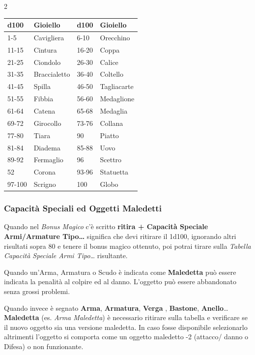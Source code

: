 \begin{multicols}{2}
{\begin{tabularx}{\linewidth}{X|l|X|l}
		\toprule
\rowcolor{gray!20}\textbf{d100} & \textbf{Gioiello} & \textbf{d100} & \textbf{Gioiello}\\
\toprule
1-5 & Cavigliera & 6-10 & Orecchino \\
\rowcolor{gray!20}11-15 & Cintura& 16-20 & Coppa\\
21-25 & Ciondolo& 26-30 & Calice\\
\rowcolor{gray!20}31-35 & Braccialetto& 36-40 & Coltello\\
41-45 & Spilla& 46-50 & Tagliacarte\\
\rowcolor{gray!20}51-55 & Fibbia& 56-60 & Medaglione\\
61-64 & Catena& 65-68 & Medaglia\\
\rowcolor{gray!20}69-72 & Girocollo& 73-76 & Collana\\
77-80 & Tiara& 90& Piatto\\
\rowcolor{gray!20}81-84 & Diadema& 85-88 & Uovo\\
89-92 & Fermaglio& 96 & Scettro\\
\rowcolor{gray!20}52    & Corona& 93-96 & Statuetta\\
97-100 & Scrigno& 100 & Globo
\end{tabularx}

\subsubsection{Capacità Speciali ed Oggetti Maledetti}

Quando nel \emph{Bonus Magico} c'è scritto \textbf{ritira + Capacità Speciale Armi/Armature Tipo…} significa che devi ritirare il 1d100, ignorando altri risultati sopra 80 e tenere il bonus magico ottenuto, poi potrai tirare sulla \emph{Tabella Capacità Speciale Armi Tipo…} risultante.

Quando un'Arma, Armatura o Scudo è indicata come \textbf{Maledetta} può essere indicata la penalità al colpire ed al danno. L'oggetto può essere abbandonato senza grossi problemi.

Quando invece è segnato \textbf{Arma}, \textbf{Armatura}, \textbf{Verga} , \textbf{Bastone}, \textbf{Anello}… \textbf{Maledetta} (es. \emph{Arma Maledetta}) è necessario ritirare sulla tabella e verificare se il nuovo oggetto sia una versione maledetta. In caso fosse disponibile selezionarlo altrimenti l'oggetto si comporta come un oggetto maledetto -2 (attacco/ danno o Difesa) o non funzionante.\hypertarget{Arma Maledetta}{}\hypertarget{Maledetta}{}\hypertarget{Armatura Maledetta}{}

}
\end{multicols}
